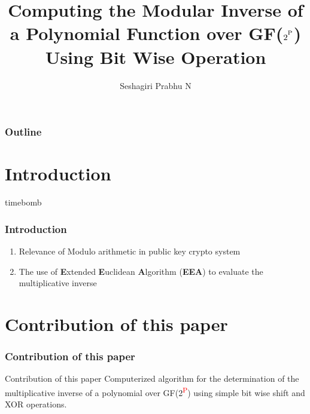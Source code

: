 \documentclass[12pt]{beamer}
\title{Computing the Modular Inverse of a Polynomial Function over GF($2^\textsuperscript{P}$)\\ Using Bit Wise Operation}
\author{Seshagiri Prabhu N}
\institute[Amrita Vishwa Vidyapeetham] %
{
  \begin{center}
    M.Tech, Cyber Security and Networks (First Year)\\
  	Amrita School of Engineering,
	Amritapuri Campus
  \end{center}
  
}
\def\SP#1{\textsuperscript{\textcolor{red}{#1}}}
\begin{document}
\frame{\titlepage}
\section*{}
\begin{frame}
  \frametitle{Outline}
  \tableofcontents[section=1,hidesubsections]
\end{frame}



\section{Introduction}

\begin{frame}{timebomb}
  \frametitle{Introduction}
	\begin{enumerate}
		\item Relevance of Modulo arithmetic in public key crypto system
		\item The use of \textbf{E}xtended \textbf{E}uclidean \textbf{A}lgorithm (\textbf{EEA}) to evaluate the multiplicative inverse
	\end{enumerate}
\end{frame}


\section{Contribution of this paper}
\begin{frame}
\frametitle{Contribution of this paper}
	\begin{block}{Contribution of this paper}
		Computerized algorithm for the determination of the multiplicative inverse of a polynomial over GF(2\SP{P}) using simple bit wise shift and XOR operations. 	
	\end{block}
\end{frame}
\end{document}
